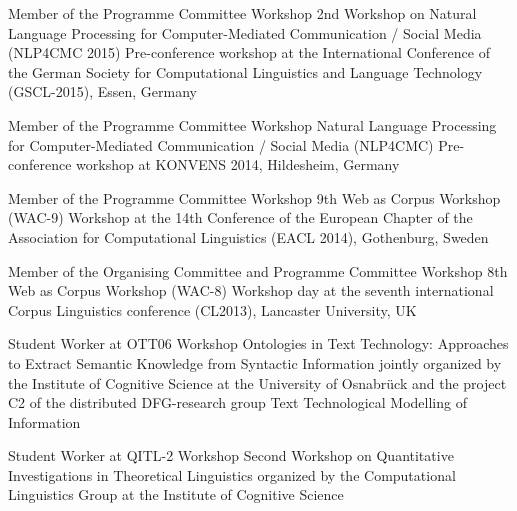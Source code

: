 
        {Member of the Programme Committee}
        {Workshop}
        {2nd Workshop on Natural Language Processing for Computer-Mediated Communication /
        Social Media (NLP4CMC 2015)}
        {Pre-conference workshop at the International Conference of the German
        Society for Computational Linguistics and Language Technology
        (GSCL-2015), Essen, Germany}
        {}

        {Member of the Programme Committee}
        {Workshop}
        {Natural Language Processing for Computer-Mediated Communication /
        Social Media (NLP4CMC)}
        {Pre-conference workshop at KONVENS 2014, Hildesheim, Germany}
        {}

        {Member of the Programme Committee}
        {Workshop}
        {9th Web as Corpus Workshop (WAC-9)}
        {Workshop at the 14th Conference of the European Chapter of the
        Association for Computational Linguistics (EACL 2014), Gothenburg,
        Sweden}
        {}

        {Member of the Organising Committee and Programme Committee}
        {Workshop}
        {8th Web as Corpus Workshop (WAC-8)}
        {Workshop day at the seventh international Corpus Linguistics
        conference (CL2013), Lancaster University, UK}
        {}

        {Student Worker at OTT06}
        {Workshop}
        {Ontologies in Text Technology: Approaches to Extract Semantic
        Knowledge from Syntactic Information}
        {jointly organized by the Institute of Cognitive Science at the
        University of Osnabr\"{u}ck and the project C2 of the distributed
        DFG-research group Text Technological Modelling of Information}
        {}

        {Student Worker at QITL-2}
        {Workshop}
        {Second Workshop on Quantitative Investigations in Theoretical
        Linguistics}
        {organized by the Computational Linguistics Group at the Institute of
        Cognitive Science}
        {}


